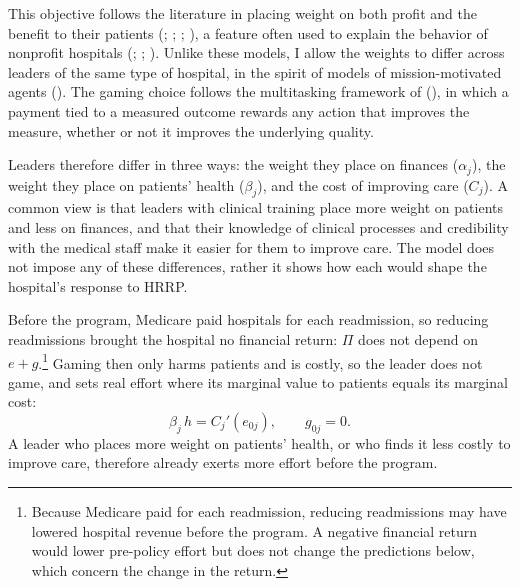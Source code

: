 \documentclass[12pt]{article}
\theoremstyle{definition}   %
\begin{document}
    This objective follows the literature in placing weight on both profit and the benefit to their patients (\cite{newhouse1970toward}; \cite{ellis1986provider}; \cite{chalkley1998contracting}; \cite{brekke2011hospital}), a feature often used to explain the behavior of nonprofit hospitals (\cite{lakdawalla2006nonprofit}; \cite{deneffe2002not}; \cite{horwitz2009hospital}). Unlike these models, I allow the weights to differ across leaders of the same type of hospital, in the spirit of models of mission-motivated agents (\cite{besley2005competition}). The gaming choice follows the multitasking framework of \citeauthor{holmstrom1991multitask} (\citeyear{holmstrom1991multitask}), in which a payment tied to a measured outcome rewards any action that improves the measure, whether or not it improves the underlying quality.
 
    Leaders therefore differ in three ways: the weight they place on finances ($\alpha_j$), the weight they place on patients' health ($\beta_j$), and the cost of improving care ($C_j$). A common view is that leaders with clinical training place more weight on patients and less on finances, and that their knowledge of clinical processes and credibility with the medical staff make it easier for them to improve care. The model does not impose any of these differences, rather it shows how each would shape the hospital's response to HRRP.
 
    Before the program, Medicare paid hospitals for each readmission, so reducing readmissions brought the hospital no financial return: $\Pi$ does not depend on $e + g$.\footnote{Because Medicare paid for each readmission, reducing readmissions may have lowered hospital revenue before the program. A negative financial return would lower pre-policy effort but does not change the predictions below, which concern the change in the return.} Gaming then only harms patients and is costly, so the leader does not game, and sets real effort where its marginal value to patients equals its marginal cost:
    \begin{equation}\label{eq:pre}
    \beta_j \, h = C_j'(e_{0j}), \qquad g_{0j} = 0.
    \end{equation}
    A leader who places more weight on patients' health, or who finds it less costly to improve care, therefore already exerts more effort before the program. 
\end{document}
